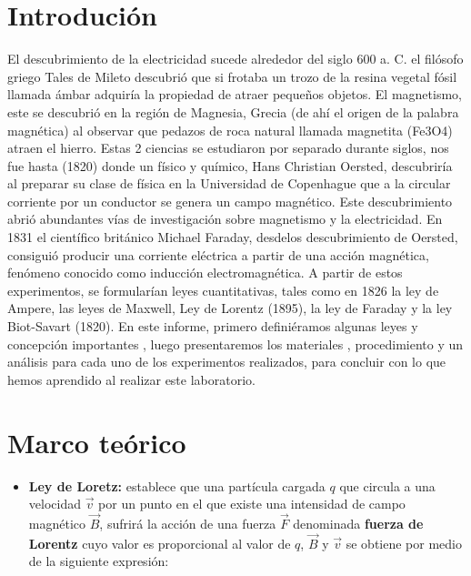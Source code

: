 \documentclass[]{article}
\begin{document}
\begin{multicols*}{2}

\section*{Introdución}
El descubrimiento de la electricidad sucede alrededor del siglo 600 a. C. el filósofo griego Tales de Mileto descubrió que si frotaba un trozo de la resina vegetal fósil llamada ámbar adquiría la propiedad de atraer pequeños objetos.
 El magnetismo, este se descubrió en la región de Magnesia, Grecia (de ahí el origen de la palabra magnética) al observar que pedazos de roca natural llamada magnetita (Fe3O4) atraen el hierro.
Estas 2 ciencias se estudiaron por separado durante siglos, nos fue hasta (1820) donde un físico y químico, Hans Christian Oersted, descubriría al preparar su clase de física en la Universidad de Copenhague que a la circular corriente por un conductor se genera un campo magnético.
Este descubrimiento abrió abundantes vías de investigación sobre magnetismo y la electricidad.  
En 1831 el científico británico Michael Faraday, desdelos descubrimiento de Oersted, consiguió producir una corriente eléctrica a partir de una acción magnética, fenómeno conocido como inducción electromagnética.
 A partir de estos experimentos, se formularían leyes cuantitativas, tales como en 1826 la ley de Ampere, las leyes de Maxwell, Ley de Lorentz (1895), la ley de Faraday y la ley Biot-Savart (1820).
 En este informe, primero definiéramos algunas leyes y concepción importantes , luego presentaremos los materiales , procedimiento y un análisis para cada uno de los experimentos realizados, para concluir con lo que hemos aprendido al realizar este laboratorio.


\section*{Marco teórico}
\begin{itemize}
    \item \textbf{Ley de Loretz: }\cite{Ley-de-Lorentz}  establece que una partícula cargada $q$ que circula a una velocidad $\overrightarrow{v}$ por un punto en el que existe una 
    intensidad de campo magnético $\overrightarrow{B}$, sufrirá la acción de una fuerza $\overrightarrow{F}$ denominada \textbf{fuerza de Lorentz} cuyo valor
    es proporcional al valor de $q$, $\overrightarrow{B}$ y $\overrightarrow{v}$ se obtiene por medio de la siguiente expresión:
    

\end{itemize}
\end{multicols*}
\end{document}
